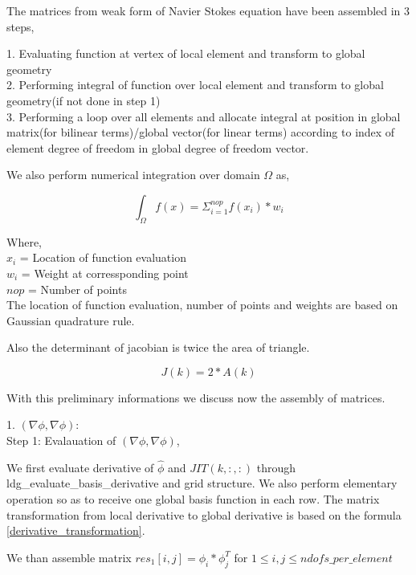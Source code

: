 \documentclass[a4paper,12pt]{book}
\begin{document}
The matrices from weak form of Navier Stokes equation have been assembled in 3 steps,

1. Evaluating function at vertex of local element and transform to global geometry\\
2. Performing integral of function over local element and transform to global geometry(if not done in step 1)\\
3. Performing a loop over all elements and allocate integral at position in global matrix(for bilinear terms)/global vector(for linear terms) according to index of element degree of freedom in global degree of freedom vector.

We also perform numerical integration over domain $\Omega$ as,

\begin{equation}\label{numerical integration}
\int_{\Omega} f(x) = \Sigma_{i=1}^{nop} f(x_i) * w_i
\end{equation}

Where, \\

$x_i$ = Location of function evaluation\\
$w_i$ = Weight at corressponding point\\
$nop$ = Number of points\\

The location of function evaluation, number of points and weights are based on Gaussian quadrature rule.

Also the determinant of jacobian is twice the area of triangle.

\begin{equation}\label{determinant to area}
J(k) = 2*A(k)
\end{equation}

With this preliminary informations we discuss now the assembly of matrices.

1. $(\nabla \phi, \nabla \phi)$:\\

Step 1: Evalauation of $(\nabla \phi , \nabla \phi)$,

We first evaluate derivative of $\hat{\phi}$ and $JIT(k,:,:)$ through ldg\_evaluate\_basis\_derivative and grid structure. We also perform elementary operation so as to receive one global basis function in each row. The matrix transformation from local derivative to global derivative is based on the formula \ref{derivative_transformation}.

We than assemble matrix $res_1[i,j]=\phi_i*\phi_j^T$ for $1 \leq i,j \leq ndofs\_per\_element$\\
\end{document}
